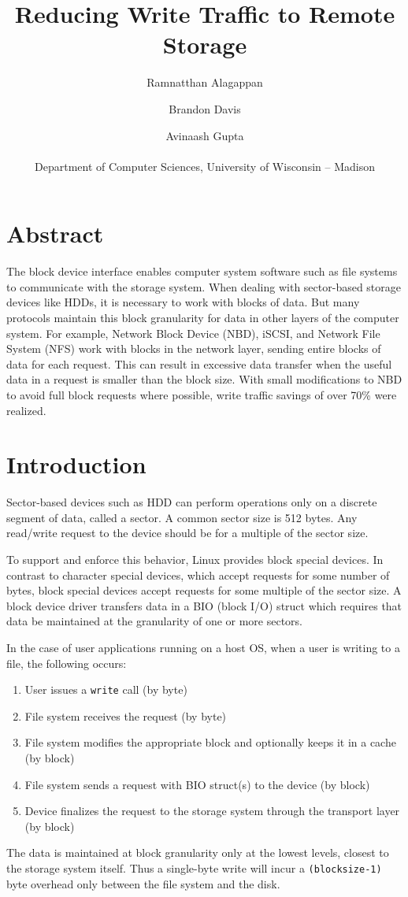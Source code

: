 \documentclass[10pt,twocolumn]{article}
\title{Reducing Write Traffic to Remote Storage}
\author{Ramnatthan Alagappan \and Brandon Davis \and Avinaash Gupta\\\\
Department of Computer Sciences, University of Wisconsin -- Madison}
\begin{document}
\maketitle

\section*{Abstract}
The block device interface enables computer system software such as file
systems to communicate with the storage system. %
When dealing with sector-based storage devices like HDDs, it is necessary to
work with blocks of data. %
But many protocols maintain this block granularity for data in other layers of
the computer system. %
For example, Network Block Device (NBD), iSCSI, and Network File System (NFS)
work with blocks in the network layer, sending entire blocks of data for each
request. %
This can result in excessive data transfer when the useful data in a request is
smaller than the block size. %
With small modifications to NBD to avoid full block requests where possible,
write traffic savings of over 70\% were realized. %

\section{Introduction}
\label{sec:introduction}
Sector-based devices such as HDD can perform operations only on a discrete
segment of data, called a sector. %
A common sector size is 512 bytes. %
Any read/write request to the device should be for a multiple of the
sector size. %

To support and enforce this behavior, Linux provides block special devices. %
In contrast to character special devices, which accept requests for some number
of bytes, block special devices accept requests for some multiple of the sector
size. %
A block device driver transfers data in a BIO (block I/O) struct which requires
that data be maintained at the granularity of one or more sectors. %

In the case of user applications running on a host OS, when a user is writing to
a file, the following occurs: %
\begin{enumerate}
  \item{User issues a \texttt{write} call (by byte)}
  \item{File system receives the request (by byte)}
  \item{File system modifies the appropriate block and optionally
        keeps it in a cache (by block)}
  \item{File system sends a request with BIO struct(s) to the device (by block)}
  \item{Device finalizes the request to the storage system through the transport
    layer (by block)}
\end{enumerate}
The data is maintained at block granularity only at the lowest levels, closest
to the storage system itself. %
Thus a single-byte write will incur a \mbox{\texttt{(blocksize-1)}} byte
overhead only between the file system and the disk. %
\end{document}
